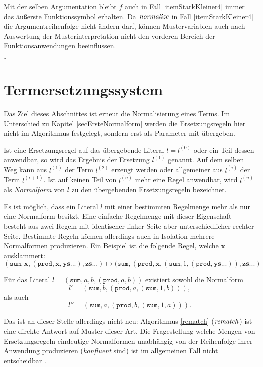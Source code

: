 Mit der selben Argumentation bleibt $f$ auch in Fall \ref{itemStarkKleiner4} immer das äußerste Funktionssymbol erhalten. 
Da $\mathit{normalize}$ in Fall \ref{itemStarkKleiner4} die Argumentreihenfolge nicht ändern darf, können Mustervariablen auch nach Auswertung der Musterinterpretation nicht den vorderen Bereich der Funktionsanwendungen beeinflussen.  

\hfill $\square$\\








\section{Termersetzungssystem} \label{subsecTermersetzungssystem}

Das Ziel dieses Abschnittes ist erneut die Normalisierung eines Terms. Im Unterschied zu Kapitel \ref{secErsteNormalform} werden die Ersetzungsregeln hier nicht im Algorithmus festgelegt, sondern erst als Parameter mit übergeben. 

Ist eine Ersetzungsregel auf das übergebende Literal $l = l^{(0)}$ oder ein Teil dessen anwendbar, so wird das Ergebnis der Ersetzung $l^{(1)}$ genannt. Auf dem selben Weg kann aus $l^{(1)}$ der Term $l^{(2)}$ erzeugt werden oder allgemeiner aus $l^{(i)}$ der Term $l^{(i+1)}$. Ist auf keinen Teil von $l^{(n)}$ mehr eine Regel anwendbar, wird $l^{(n)}$ als \emph{Normalform} von $l$ zu den übergebenden Ersetzungsregeln bezeichnet. 

Es ist möglich, dass ein Literal $l$ mit einer bestimmten Regelmenge mehr als nur eine Normalform besitzt. Eine einfache Regelmenge mit dieser Eigenschaft besteht aus zwei Regeln mit identischer linker Seite aber unterschiedlicher rechter Seite. Bestimmte Regeln können allerdings auch in Isolation mehrere Normalformen produzieren. Ein Beispiel ist die folgende Regel, welche $\mathbf x$ ausklammert:
$$(\texttt{sum}, \mathbf x, (\texttt{prod}, \mathbf x, \mathbf{ys...}), \mathbf{zs...}) 
\mapsto (\texttt{sum}, (\texttt{prod}, \mathbf x, (\texttt{sum}, 1, (\texttt{prod}, \mathbf{ys...})) , \mathbf{zs...})$$

Für das Literal $l = (\texttt{sum}, a, b, (\texttt{prod}, a, b))$ existiert sowohl die Normalform 
$$l' = (\texttt{sum}, b, (\texttt{prod}, a, (\texttt{sum}, 1, b))),$$ 
als auch 
$$l'' = (\texttt{sum}, a, (\texttt{prod}, b, (\texttt{sum}, 1, a))).$$

Das ist an dieser Stelle allerdings nicht neu: Algorithmus \ref{rematch} ($\mathit{rematch}$) ist eine direkte Antwort auf Muster dieser Art. Die Fragestellung welche Mengen von Ersetzungsregeln eindeutige Normalformen unabhängig von der Reihenfolge ihrer Anwendung produzieren (\emph{konfluent} sind) ist im allgemeinen Fall nicht entscheidbar \cite{KonfluenzUnentscheidbar}.



